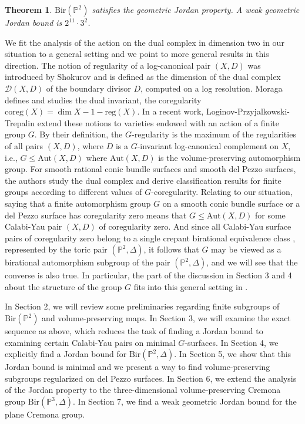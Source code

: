 \documentclass[a4paper,12pt,oneside]{amsart}
\numberwithin{equation}{section}
\newtheorem{theorem}{Theorem}[section]
\theoremstyle{definition}
\theoremstyle{remark}
\newcommand{\PP}{\mathbb{P}}
\newcommand{\Ptwo}{\mathbb{P}^2}
\newcommand{\Bir}{\mathrm{Bir}}
\newcommand{\Aut}{\mathrm{Aut}}
\begin{document}
\begin{theorem} \label{thmgeo}
$\mathrm{Bir}(\mathbb P^2)$ satisfies the geometric Jordan property. A weak geometric Jordan bound is $2^{11} \cdot 3^2$. 
\end{theorem}




We fit the analysis of the action on the dual complex in dimension two in our situation to a general setting and we point to more general results in this direction. The notion of regularity of a log-canonical pair $(X,D)$ was introduced by Shokurov \cite{shokurov} and is defined as the dimension of the dual complex $\mathcal{D}(X,D)$ of the boundary divisor $D$, computed on a log resolution. Moraga \cite{mor} defines and studies the dual invariant, the coregularity
\(
\mathrm{coreg}(X)=\dim X-1-\mathrm{reg}(X).
\)
In a recent work, Loginov-Przyjalkowski-Trepalin \cite{przy} extend these notions to varieties endowed with an action of a finite group $G$. By their definition, the $G$-regularity is the maximum of the regularities of all pairs
$(X,D)$, where $D$ is a $G$-invariant log-canonical complement on $X$, i.e., $G\leqslant \Aut(X,D)$ where $\Aut(X,D)$ is the volume-preserving automorphism group. For smooth rational conic bundle surfaces and smooth del Pezzo surfaces, the authors study the dual complex and derive classification results for finite groups according to different values of 
$G$-coregularity. Relating to our situation, saying that a finite automorphism group $G$ on a smooth conic bundle surface or a del Pezzo surface has coregularity zero means that $G\leqslant \Aut(X,D)$ for some Calabi-Yau pair $(X,D)$ of coregularity zero. And since all Calabi-Yau surface pairs of coregularity zero belong to a single crepant birational equivalence class 
\cite[Section 1.3]{ducat2022quarticsurfacesvolumepreserving}, represented by the toric pair $(\mathbb{P}^2,\Delta)$, it follows that $G$ may be viewed as a birational automorphism subgroup of the pair $(\mathbb{P}^2,\Delta)$, and we will see that the converse is also true. In particular, the part of the discussion in Section 3 and 4 about the structure of the group $G$ fits into this general setting in \cite{przy}.


In Section 2, we will review some preliminaries regarding finite subgroups of $\mathrm{Bir}(\Ptwo)$ and volume-preserving maps. In Section 3, we will examine the exact sequence as above, which reduces the task of finding a Jordan bound to examining certain Calabi-Yau pairs on minimal $G$-surfaces. In Section 4, we explicitly find a Jordan bound for $\Bir(\Ptwo, \Delta)$. In Section 5, we show that this Jordan bound is minimal and we present a way to find volume-preserving subgroups regularized on del Pezzo surfaces. In Section 6, we extend the analysis of the Jordan property to the three-dimensional volume-preserving Cremona group $
\Bir(\PP^3, \Delta)$. In Section 7, we find a weak geometric Jordan bound for the plane Cremona group.
\end{document}
